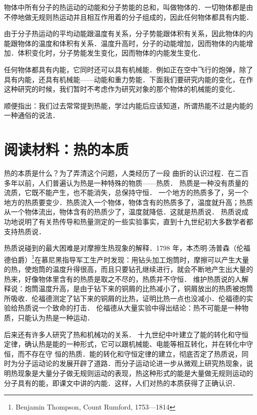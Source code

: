 物体中所有分子的热运动的动能和分子势能的总和，叫做物体的．一切物体都是由不停地做无规则热运动并且相互作用着的分子组成的，因此任何物体都具有内能．

由于分子热运动的平均动能跟温度有关系，分子势能跟体积有关系，因此物体的内能跟物体的温度和体积有关系．温度升高时，分子的动能增加，因而物体的内能增加．体积变化时，分子势能发生变化，因而物体的内能发生变化．

任何物体都具有内能，它同时还可以具有机械能．例如正在空中飞行的炮弹，除了具有内能，还具有机械能——动能和重力势能．下面我们要研究内能的变化，在作这种研究的时候，我们暂时不考虑作为研究对象的那个物体的机械能的变化．

顺便指出：我们过去常常提到热能，学过内能后应该知道，所谓热能不过是内能的一种通俗的说法．

\section*{阅读材料：热的本质}
热的本质是什么？为了弄清这个问题，人类经历了一段
曲折的认识过程．在二百多年以前，人们普遍认为热是一种特殊的物质——热质．
热质是一种没有质量的流质，它既不能产生，也不能消失，总保持守恒．
一个地方的热质多了，另一个地方的热质要变少．热质流入一个物体，物体含有的热质多了，温度就升高；热质从一个物体流出，物体含有的热质少了，温度就降低．这就是热质说．
热质说成功地说明了有关热传导和热量测定的一些实验事实，直到十九世纪初大多数学者都支持热质说．

热质说碰到的最大困难是对摩擦生热现象的解释．1798
年，本杰明$\cdot$汤普森（伦福德伯爵）\footnote{Benjamin Thompson, Count Rumford, 1753---1814}在慕尼黑指导军工生产时发现：用钻头加工炮筒时，摩擦可以产生大量的热，使炮筒的温度升得很高，而且只要钻孔继续进行，就会不断地产生出大量的热来，好像物体里含有的热质是取之不尽的，热质并不守恒．
维护热质说的人解释说：炮筒温度升高，是由于钻下来的铜屑的比热减小了，铜屑放出的热质被炮筒所吸收．伦福德测定了钻下来的铜屑的比热，证明比热一点也没减小．伦福德的实验给热质说一个致命的打击．
伦福德从大量实验中得出结论：热不可能是一种物质，只能认为热是一种运动．

后来还有许多人研究了热和机械功的关系．
十九世纪中叶建立了能的转化和守恒定律，确认热是能的一种形式，它可以跟机械能、电能等相互转化，并在转化中守恒，而不存在守
恒的热质．能的转化和守恒定律的建立，彻底否定了热质说，同时为分子运动论的发展开辟了道路．而分子运动论进一步从微观上研究热现象，说明热现象是大量分子做无规则运动的表现，热这种形式的能是大量做无规则运动的分子具有的能，即课文中讲的内能．这样，人们对热的本质获得了正确认识．


